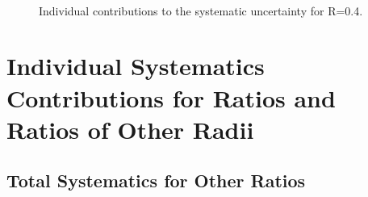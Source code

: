 \begin{figure}[h!]
    \qquad
    \\
    \qquad
    \caption{Individual contributions to the systematic uncertainty for R=0.4.}
    \label{fig:IndividualSysR04pPb}
\end{figure}

\newpage

\section{Individual Systematics Contributions for Ratios and Ratios of Other Radii}
\label{sec:AppendixSystematicsRatiospPb}

\subsection{Total Systematics for Other Ratios}
\label{subsec:appendixTotalSystematicsRatiospPb}

